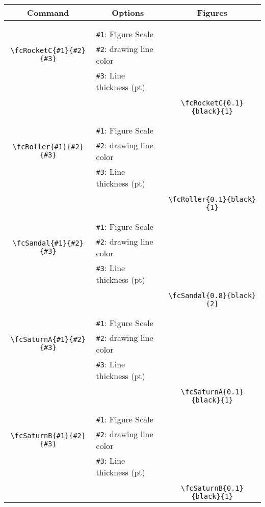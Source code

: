\documentclass[x11names]{article}
\begin{document}
\begin{table}[H]\centering\begin{tabular}{|c|l|c|}\hline {\bf Command}& \multicolumn{1}{c|}{{\bf Options}} & {\bf Figures}\\  \hline	&&\multirow{5}{*}{\fcRocketC{0.1}{black}{1}}\\	&&\\	&\verb|#1|: Figure Scale &\\	\verb|\fcRocketC{#1}{#2}{#3}|&	\verb|#2|: drawing line color &\\	&\verb|#3|: Line thickness (pt) &\\ &&\\&&	\verb|\fcRocketC{0.1}{black}{1}|\\\hline 	
	&&\multirow{5}{*}{\fcRoller{0.1}{black}{1}}\\	&&\\	&\verb|#1|: Figure Scale &\\	\verb|\fcRoller{#1}{#2}{#3}|&	\verb|#2|: drawing line color &\\	&\verb|#3|: Line thickness (pt) &\\ &&\\&&	\verb|\fcRoller{0.1}{black}{1}|\\\hline 	
	&&\multirow{5}{*}{\fcSandal{0.8}{black}{2}}\\	&&\\	&\verb|#1|: Figure Scale &\\	\verb|\fcSandal{#1}{#2}{#3}|&	\verb|#2|: drawing line color &\\	&\verb|#3|: Line thickness (pt) &\\ &&\\&&	\verb|\fcSandal{0.8}{black}{2}|\\\hline 	
	&&\multirow{5}{*}{\fcSaturnA{0.1}{black}{1}}\\	&&\\	&\verb|#1|: Figure Scale &\\	\verb|\fcSaturnA{#1}{#2}{#3}|&	\verb|#2|: drawing line color &\\	&\verb|#3|: Line thickness (pt) &\\ &&\\&&	\verb|\fcSaturnA{0.1}{black}{1}|\\\hline 	
	&&\multirow{5}{*}{\fcSaturnB{0.1}{black}{1}}\\	&&\\	&\verb|#1|: Figure Scale &\\	\verb|\fcSaturnB{#1}{#2}{#3}|&	\verb|#2|: drawing line color &\\	&\verb|#3|: Line thickness (pt) &\\ &&\\&&	\verb|\fcSaturnB{0.1}{black}{1}|\\\hline 	

\end{tabular}
\end{table}
\end{document}
